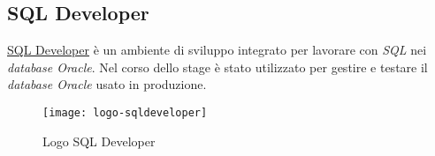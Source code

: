 \subsection{SQL Developer}
\href{https://www.oracle.com/database/technologies/appdev/sqldeveloper-landing.html}{SQL Developer} è un ambiente di sviluppo integrato per lavorare con \textit{SQL} nei \textit{database Oracle}. Nel corso dello stage è stato utilizzato per gestire e testare il \textit{database Oracle} usato in produzione.
\begin{figure}[h]
    \begin{center}
    \texttt{[image: logo-sqldeveloper]}
    \caption{Logo SQL Developer}
    \label{fig:figure13}
    \end{center}
\end{figure}